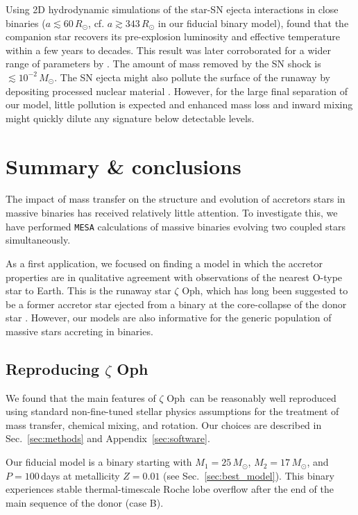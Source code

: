 \documentclass[twocolumn,twocolappendix,trackchanges]{aastex63}
\DeclareRobustCommand{\Secref}[1]{Sec.~\ref{#1}}
\newcommand{\zoph}{$\zeta$ Oph}
\begin{document}
Using 2D hydrodynamic simulations of the star-SN ejecta interactions
in close binaries ($a\lesssim 60\,R_\odot$,
cf. $a\gtrsim 343\,R_\odot$ in our fiducial binary model),
\cite{hirai:18} found that the companion star recovers its
pre-explosion luminosity and effective temperature within a few years
to decades. This result was later corroborated for a wider range of
parameters by \cite{ogata:21}. The amount of mass removed by the SN
shock is $\lesssim10^{-2}\,M_\odot$.  The SN ejecta might also pollute
the surface of the runaway by depositing processed nuclear material
\citep[e.g.,][]{przybilla:08, suda:21}. However, for the large final
separation of our model, little pollution is expected and enhanced
mass loss and inward mixing might quickly dilute any signature below
detectable levels.



\section{Summary \& conclusions}
\label{sec:conclusions}

The impact of mass transfer on the structure and evolution of
accretors stars in massive binaries has received relatively little
attention. To investigate this, we have performed \texttt{MESA}
calculations of massive binaries evolving two coupled stars
simultaneously.

As a first application, we focused on finding a model in which the
accretor properties are in qualitative agreement with observations of
the nearest O-type star to Earth. This is the runaway star \zoph, which has
long been suggested to be a former accretor star ejected from a binary
at the core-collapse of the donor star \citep[binary SN
scenario,][]{blaauw:61}. However, our models are also informative for
the generic population of massive stars accreting in binaries.


\subsection{Reproducing \zoph}

We found that the main features of \zoph\ can be
reasonably well reproduced using standard non-fine-tuned stellar physics
assumptions for the treatment of mass transfer, chemical mixing, and
rotation. Our choices are described in \Secref{sec:methods} and
Appendix~\ref{sec:software}.

Our fiducial model is a binary starting
with $M_1=25\,M_\odot$, $M_2=17\,M_\odot$, and $P=100$\,days at
metallicity $Z=0.01$ (see \Secref{sec:best_model}). This binary
experiences stable thermal-timescale Roche lobe overflow after the end
of the main sequence of the donor (case B).
\end{document}
